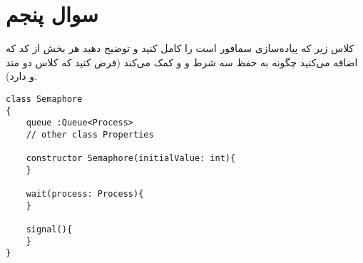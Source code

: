 \section{سوال پنجم}

کلاس زیر که پیاده‌سازی سمافور است را کامل کنید و توضیح دهید هر بخش از کد که اضافه می‌کنید چگونه به حفظ سه شرط  و  و  کمک می‌کند (فرض کنید که کلاس  دو متد  و  دارد).


\begin{latin}
\begin{lstlisting}[caption=Code of Q5, label=cpp_code_example]
class Semaphore 
{
	queue :Queue<Process>
	// other class Properties
	
	constructor Semaphore(initialValue: int){
	}
	
	wait(process: Process){
	}
	
	signal(){
	}
}
\end{lstlisting}
\end{latin}




\begin{qsolve}
	
\end{qsolve}